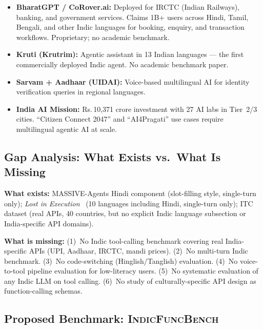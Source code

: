 \documentclass[11pt]{article}
\begin{document}
\begin{itemize}[leftmargin=1.2em, itemsep=3pt]
  \item \textbf{BharatGPT / CoRover.ai:} Deployed for IRCTC (Indian Railways), banking, and
        government services. Claims 1B+ users across Hindi, Tamil, Bengali, and other Indic
        languages for booking, enquiry, and transaction workflows. Proprietary; no academic benchmark.
  \item \textbf{Kruti (Krutrim):} Agentic assistant in 13 Indian languages --- the first
        commercially deployed Indic agent. No academic benchmark paper.
  \item \textbf{Sarvam + Aadhaar (UIDAI):} Voice-based multilingual AI for identity verification
        queries in regional languages.
  \item \textbf{India AI Mission:} Rs.\,10,371 crore investment with 27 AI labs in Tier~2/3
        cities. ``Citizen Connect 2047'' and ``AI4Pragati'' use cases require multilingual agentic
        AI at scale.
\end{itemize}

\subsection{Gap Analysis: What Exists vs.\ What Is Missing}

\textbf{What exists:}
MASSIVE-Agents Hindi component (slot-filling style, single-turn only);
\emph{Lost in Execution}~\citep{lostinexecution2025} (10 languages including Hindi, single-turn
only); ITC dataset (real APIs, 40 countries, but no explicit Indic language subsection or
India-specific API domains).

\textbf{What is missing:}
(1)~No Indic tool-calling benchmark covering real India-specific APIs (UPI, Aadhaar, IRCTC, mandi
prices). (2)~No multi-turn Indic benchmark. (3)~No code-switching (Hinglish/Tanglish) evaluation.
(4)~No voice-to-tool pipeline evaluation for low-literacy users. (5)~No systematic evaluation of
any Indic LLM on tool calling. (6)~No study of culturally-specific API design as function-calling
schemas.

\subsection{Proposed Benchmark: \textsc{IndicFuncBench}}
\end{document}

